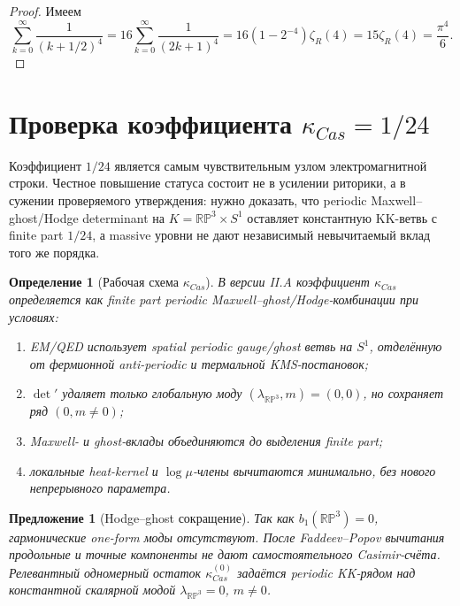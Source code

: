 \documentclass[12pt,a4paper]{report}
\newtheorem{definition}{Определение}[chapter]
\newtheorem{proposition}{Предложение}[chapter]
\theoremstyle{remark}
\begin{document}
\begin{proof}
Имеем
\begin{equation}
    \sum_{k=0}^{\infty}\frac{1}{(k+1/2)^4}
    =16\sum_{k=0}^{\infty}\frac{1}{(2k+1)^4}
    =16\left(1-2^{-4}\right)\zeta_R(4)
    =15\zeta_R(4)=\frac{\pi^4}{6}.
\end{equation}
\end{proof}

\section{Проверка коэффициента \texorpdfstring{\(\kappa_{Cas}=1/24\)}{kappa Cas = 1/24}}

Коэффициент \(1/24\) является самым чувствительным узлом электромагнитной строки. Честное повышение статуса состоит не в усилении риторики, а в сужении проверяемого утверждения: нужно доказать, что periodic Maxwell--ghost/Hodge determinant на \(K=\mathbb{RP}^3\times S^1\) оставляет константную KK-ветвь с finite part \(1/24\), а massive уровни не дают независимый невычитаемый вклад того же порядка.

\begin{definition}[Рабочая схема \(\kappa_{Cas}\)]
В версии II.A коэффициент \(\kappa_{Cas}\) определяется как finite part periodic Maxwell--ghost/Hodge-комбинации при условиях:
\begin{enumerate}
    \item EM/QED использует spatial periodic gauge/ghost ветвь на \(S^1\), отделённую от фермионной anti-periodic и термальной KMS-постановок;
    \item \(\det'\) удаляет только глобальную моду \((\lambda_{\mathbb{RP}^3},m)=(0,0)\), но сохраняет ряд \((0,m\neq0)\);
    \item Maxwell- и ghost-вклады объединяются до выделения finite part;
    \item локальные heat-kernel и \(\log\mu\)-члены вычитаются минимально, без нового непрерывного параметра.
\end{enumerate}
\end{definition}

\begin{proposition}[Hodge--ghost сокращение]
Так как \(b_1(\mathbb{RP}^3)=0\), гармонические one-form моды отсутствуют. После Faddeev--Popov вычитания продольные и точные компоненты не дают самостоятельного Casimir-счёта. Релевантный одномерный остаток \(\kappa_{Cas}^{(0)}\) задаётся periodic KK-рядом над константной скалярной модой \(\lambda_{\mathbb{RP}^3}=0\), \(m\neq0\).
\end{proposition}
\end{document}
